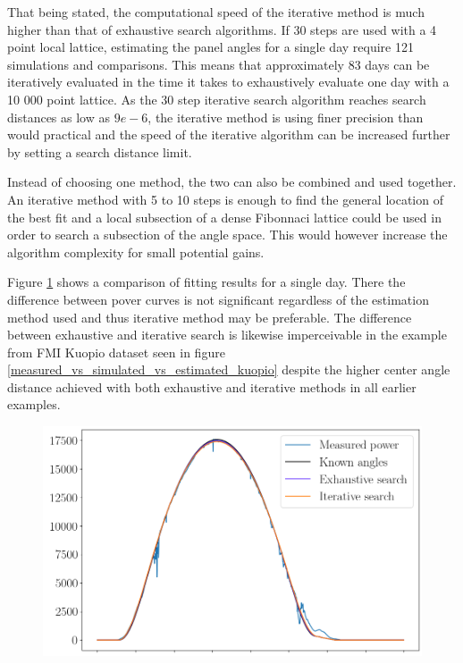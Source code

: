 That being stated, the computational speed of the iterative method is much higher than that of exhaustive search algorithms. If 30 steps are used with a 4 point local lattice, estimating the panel angles for a single day require 121 simulations and comparisons. This means that approximately 83 days can be iteratively evaluated in the time it takes to exhaustively evaluate one day with a 10 000 point lattice. As the 30 step iterative search algorithm reaches search distances as low as $9e-6$, the iterative method is using finer precision than would practical and the speed of the iterative algorithm can be increased further by setting a search distance limit.

Instead of choosing one method, the two can also be combined and used together. An iterative method with 5 to 10 steps is enough to find the general location of the best fit and a local subsection of a dense Fibonnaci lattice could be used in order to search a subsection of the angle space. This would however increase the algorithm complexity for small potential gains.

Figure \ref{measured_vs_simulated_vs_estimated} shows a comparison of fitting results for a single day. There the difference between pover curves is not significant regardless of the estimation method used and thus iterative method may be preferable. The difference between exhaustive and iterative search is likewise imperceivable in the example from FMI Kuopio dataset seen in figure \ref{measured_vs_simulated_vs_estimated_kuopio} despite the higher center angle distance achieved with both exhaustive and iterative methods in all earlier examples.


\begin{figure}[!h]
\centering
\includegraphics[width=0.8\linewidth]{pics/measured_vs_simulated_vs_estimated}
\label{measured_vs_simulated_vs_estimated}
\end{figure}

